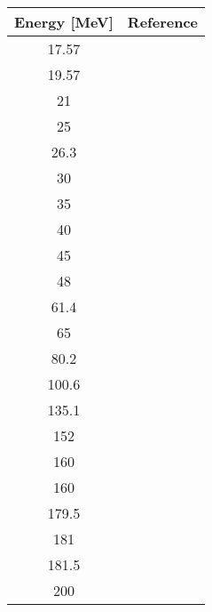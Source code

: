 \begin{tabular}{c  c} 
    \hline 
    \bf{Energy [MeV]} & \bf{Reference} \\
    \hline
    \hline 
    17.57 & \cite{Dicello71}\\
    19.57 & \cite{VanOers71}\\
    21 & \cite{Mccamis86}\\
    25 & \cite{Mccamis86}\\
    26.3 & \cite{Watson67, Mccamis86}\\
    30 & \cite{Mccamis86}\\
    35 & \cite{Mccamis86}\\
    40 & \cite{Mccamis86, Blumberg66}\\
    45 & \cite{Mccamis86}\\
    48 & \cite{Mccamis86}\\
    61.4 & \cite{Fulmer69}\\
    65 & \cite{Noro81}\\
    80.2 & \cite{Nadasen81, Schwandt82}\\
    100.6 & \cite{Seifert90}\\
    135.1 & \cite{Nadasen81}\\
    152 & \cite{Rolland66}\\
    160 & \cite{Roos65}\\
    160 & \cite{Schwandt82}\\
    179.5 & \cite{Johansson61}\\
    181 & \cite{Nadasen81, Schwandt82}\\
    181.5 & \cite{Johansson61}\\
    200 & \cite{Murdock87}\\
    \hline
\end{tabular}
